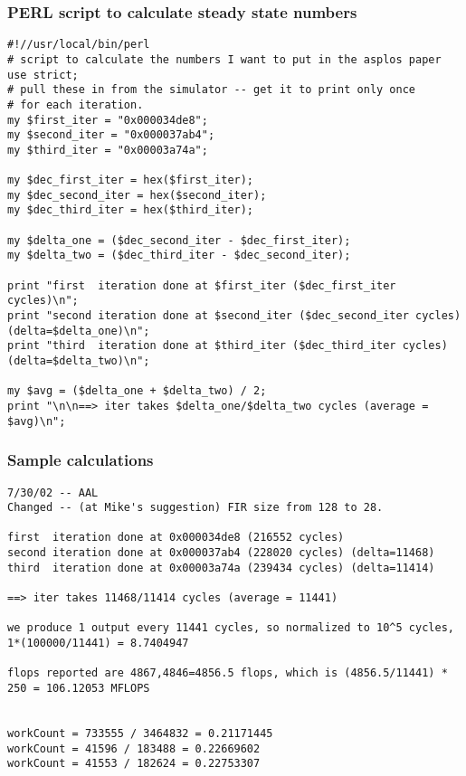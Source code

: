 \subsubsection{PERL script to calculate steady state numbers}
\begin{verbatim}
#!//usr/local/bin/perl
# script to calculate the numbers I want to put in the asplos paper
use strict;
# pull these in from the simulator -- get it to print only once
# for each iteration.
my $first_iter = "0x000034de8";
my $second_iter = "0x000037ab4";
my $third_iter = "0x00003a74a";

my $dec_first_iter = hex($first_iter);
my $dec_second_iter = hex($second_iter);
my $dec_third_iter = hex($third_iter);

my $delta_one = ($dec_second_iter - $dec_first_iter);
my $delta_two = ($dec_third_iter - $dec_second_iter);

print "first  iteration done at $first_iter ($dec_first_iter cycles)\n";
print "second iteration done at $second_iter ($dec_second_iter cycles) (delta=$delta_one)\n";
print "third  iteration done at $third_iter ($dec_third_iter cycles) (delta=$delta_two)\n";

my $avg = ($delta_one + $delta_two) / 2;
print "\n\n==> iter takes $delta_one/$delta_two cycles (average = $avg)\n";
\end{verbatim}




\subsubsection{Sample calculations}
\begin{verbatim}
7/30/02 -- AAL 
Changed -- (at Mike's suggestion) FIR size from 128 to 28.

first  iteration done at 0x000034de8 (216552 cycles)
second iteration done at 0x000037ab4 (228020 cycles) (delta=11468)
third  iteration done at 0x00003a74a (239434 cycles) (delta=11414)

==> iter takes 11468/11414 cycles (average = 11441)

we produce 1 output every 11441 cycles, so normalized to 10^5 cycles, 1*(100000/11441) = 8.7404947

flops reported are 4867,4846=4856.5 flops, which is (4856.5/11441) * 250 = 106.12053 MFLOPS


workCount = 733555 / 3464832 = 0.21171445
workCount = 41596 / 183488 = 0.22669602
workCount = 41553 / 182624 = 0.22753307
\end{verbatim}

